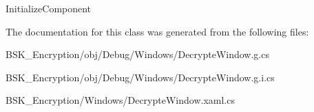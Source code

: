 Initialize\+Component 



The documentation for this class was generated from the following files\+:\begin{DoxyCompactItemize}
\item 
B\+S\+K\+\_\+\+Encryption/obj/\+Debug/\+Windows/Decrypte\+Window.\+g.\+cs\item 
B\+S\+K\+\_\+\+Encryption/obj/\+Debug/\+Windows/Decrypte\+Window.\+g.\+i.\+cs\item 
B\+S\+K\+\_\+\+Encryption/\+Windows/Decrypte\+Window.\+xaml.\+cs\end{DoxyCompactItemize}
